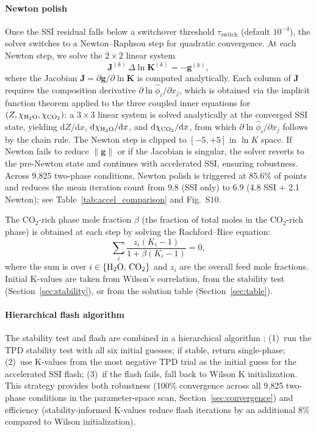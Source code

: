 \documentclass[preprint,12pt,number]{elsarticle}
\begin{document}
\paragraph{Newton polish}
Once the SSI residual falls below a switchover threshold $\tau_\text{switch}$ (default $10^{-4}$),
the solver switches to a Newton--Raphson step for quadratic convergence.
At each Newton step, we solve the $2\times 2$ linear system
\begin{equation}
  \mathbf{J}^{(k)}\,\Delta\ln\mathbf{K}^{(k)} = -\mathbf{g}^{(k)},
  \label{eq:newton}
\end{equation}
where the Jacobian $\mathbf{J} = \partial\mathbf{g}/\partial\ln\mathbf{K}$ is computed
analytically.
Each column of $\mathbf{J}$ requires the composition derivative $\partial\ln\hat{\phi}_i/\partial x_j$,
which is obtained via the implicit function theorem applied to the three coupled inner equations
for $(Z, \chi_{\rm H_2O}, \chi_{\rm CO_2})$: a $3\times 3$ linear system is solved analytically at the
converged SSI state, yielding $\mathrm{d}Z/\mathrm{d}x$, $\mathrm{d}\chi_{\rm H_2O}/\mathrm{d}x$,
and $\mathrm{d}\chi_{\rm CO_2}/\mathrm{d}x$, from which $\partial\ln\hat{\phi}_i/\partial x_j$
follows by the chain rule.
The Newton step is clipped to $[-5, +5]$ in $\ln K$ space.
If Newton fails to reduce $\|\mathbf{g}\|$ or if the Jacobian is singular,
the solver reverts to the pre-Newton state and continues with accelerated SSI,
ensuring robustness.
Across 9{,}825 two-phase conditions, Newton polish is triggered at 85.6\% of points and
reduces the mean iteration count from 9.8 (SSI only) to 6.9 (4.8 SSI + 2.1 Newton);
see Table~\ref{tab:accel_comparison} and Fig.~S10.

The CO$_2$-rich phase mole fraction $\beta$ (the fraction of total moles in the CO$_2$-rich
phase) is obtained at each step by solving the Rachford--Rice equation:
\begin{equation}
  \sum_{i} \frac{z_i(K_i - 1)}{1 + \beta(K_i - 1)} = 0,
  \label{eq:rr}
\end{equation}
where the sum is over $i \in \{{\rm H_2O},\,{\rm CO_2}\}$ and
$z_i$ are the overall feed mole fractions.
Initial K-values are taken from Wilson's correlation, from the stability test
(Section~\ref{sec:stability}), or from the solution table (Section~\ref{sec:table}).

\paragraph{Hierarchical flash algorithm}
The stability test and flash are combined in a hierarchical algorithm
\citep{Jex2024}: (1)~run the TPD stability test with all six initial guesses;
if stable, return single-phase; (2)~use K-values from the most negative TPD
trial as the initial guess for the accelerated SSI flash; (3)~if the flash
fails, fall back to Wilson K initialization.
This strategy provides both robustness (100\% convergence across all 9{,}825 two-phase
conditions in the parameter-space scan, Section~\ref{sec:convergence}) and efficiency
(stability-informed K-values reduce flash iterations by an additional 8\% compared to
Wilson initialization).
\end{document}

